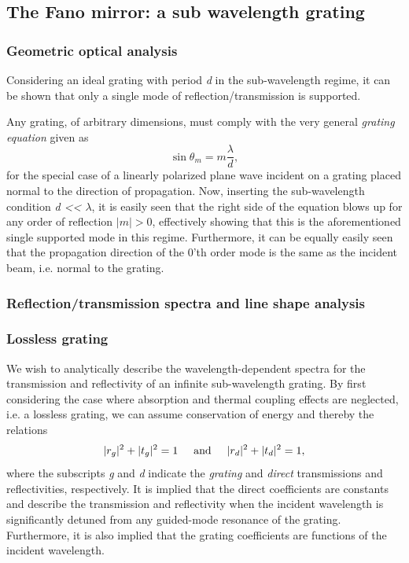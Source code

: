 \subsection{The Fano mirror: a sub wavelength grating}

\subsubsection{Geometric optical analysis}

Considering an ideal grating with period \emph{d} in the sub-wavelength regime, it can be shown that only a single mode of reflection/transmission is supported. 

Any grating, of arbitrary dimensions, must comply with the very general \emph{grating equation}\cite{Pedrotti} given as
\begin{equation}
    \sin \theta_m = m \frac{\lambda}{d},
\end{equation}
for the special case of a linearly polarized plane wave incident on a grating placed normal to the direction of propagation. Now, inserting the sub-wavelength condition \emph{d << $\lambda$}, it is easily seen that the right side of the equation blows up for any order of reflection $|m| > 0$, effectively showing that this is the aforementioned single supported mode in this regime. Furthermore, it can be equally easily seen that the propagation direction of the 0'th order mode is the same as the incident beam, i.e. normal to the grating.

\subsubsection{Reflection/transmission spectra and line shape analysis}

\subsubsection{Lossless grating}

We wish to analytically describe the wavelength-dependent spectra for the transmission and reflectivity of an infinite sub-wavelength grating. By first considering the case where absorption and thermal coupling effects are neglected, i.e. a lossless grating, we can assume conservation of energy and thereby the relations
\begin{equation}
    |r_g|^2+|t_g|^2=1 \hspace{0.5cm} \text{and} \hspace{0.5cm} |r_d|^2+|t_d|^2=1,
    \label{eq:energy conservation}
\end{equation}
where the subscripts \emph{g} and \emph{d} indicate the \emph{grating} and \emph{direct} transmissions and reflectivities, respectively. It is implied that the direct coefficients are constants and describe the transmission and reflectivity when the incident wavelength is significantly detuned from any guided-mode resonance of the grating. Furthermore, it is also implied that the grating coefficients are functions of the incident wavelength.

